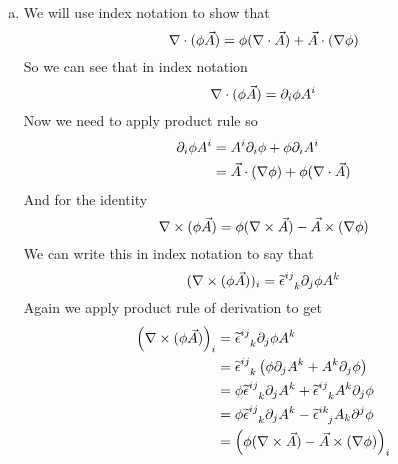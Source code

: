 \documentclass[11pt]{article}
\numberwithin{equation}{section}
\begin{document}
\begin{enumerate}[(a)]
\item
We will use index notation to show that
$$\bold\nabla\cdot(\phi\vec{A}) = \phi(\bold\nabla\cdot\vec{A}) + \vec{A}\cdot(\bold\nabla\phi)$$
So we can see that in index notation 
$$\bold\nabla\cdot(\phi\vec{A}) = \partial_i\phi A^i$$
Now we need to apply product rule so
\begin{align*}
\partial_i\phi A^i &= A^i\partial_i\phi + \phi\partial_iA^i\\
&= \vec{A}\cdot(\bold\nabla\phi) + \phi(\bold\nabla\cdot\vec{A}) 
\end{align*}
And for the identity 
$$\bold\nabla\times(\phi\vec{A}) = \phi(\bold\nabla\times\vec{A}) - \vec{A}\times(\bold\nabla\phi)$$
We can write this in index notation to say that
$$(\grad\times(\phi\vec{A}))_i = \levi^{ij}_{\ \ k}\partial_j\phi A^k$$
Again we apply product rule of derivation to get
\begin{align*}
\left(\grad\times(\phi\vec{A})\right)_i &= \levi^{ij}_{\ \ k}\partial_j\phi A^k\\
&= \levi^{ij}_{\ \ k}\left(\phi\partial_j A^k + A^k\partial_j\phi \right)\\
&= \phi\levi^{ij}_{\ \ k}\partial_j A^k + \levi^{ij}_{\ \ k}A^k\partial_j\phi \\
&= \phi\levi^{ij}_{\ \ k}\partial_j A^k - \levi^{ik}_{\ \ j}A_k\partial^j\phi \\
&= \left(\phi(\grad\times\vec{A}) - \vec{A}\times(\grad\phi)\right)_i
\end{align*}


\end{enumerate}
\end{document}
